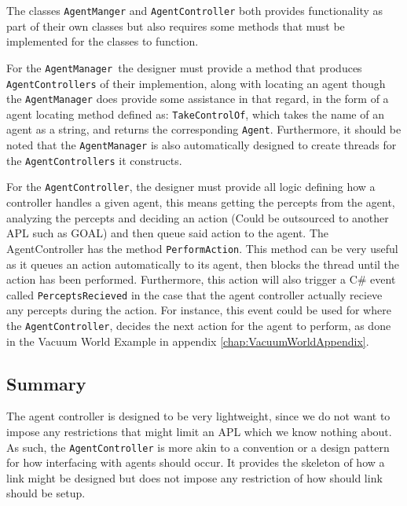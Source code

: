 The classes \texttt{AgentManger} and \texttt{AgentController} both
provides functionality as part of their own classes but also requires
some methods that must be implemented for the classes to function.

For the \texttt{AgentManager }the designer must provide a method that
produces \texttt{AgentControllers} of their implemention, along with
locating an agent though the \texttt{AgentManager} does provide some
assistance in that regard, in the form of a agent locating method
defined as: \texttt{TakeControlOf}, which takes the name of an agent
as a string, and returns the corresponding \texttt{Agent}. Furthermore,
it should be noted that the \texttt{AgentManager} is also automatically
designed to create threads for the \texttt{AgentControllers} it constructs.

For the \texttt{AgentController}, the designer must provide all logic
defining how a controller handles a given agent, this means getting
the percepts from the agent, analyzing the percepts and deciding an
action (Could be outsourced to another APL such as GOAL) and then
queue said action to the agent. The AgentController has the method
\texttt{PerformAction}. This method can be very useful as it queues
an action automatically to its agent, then blocks the thread until
the action has been performed. Furthermore, this action will also
trigger a C\# event called \texttt{PerceptsRecieved} in the case that
the agent controller actually recieve any percepts during the action.
For instance, this event could be used for where the \texttt{AgentController},
decides the next action for the agent to perform, as done in the Vacuum
World Example in appendix \ref{chap:VacuumWorldAppendix}.


\subsection*{Summary}

The agent controller is designed to be very lightweight, since we
do not want to impose any restrictions that might limit an APL which
we know nothing about. As such, the \texttt{AgentController} is more
akin to a convention or a design pattern for how interfacing with
agents should occur. It provides the skeleton of how a link might
be designed but does not impose any restriction of how should link
should be setup.
